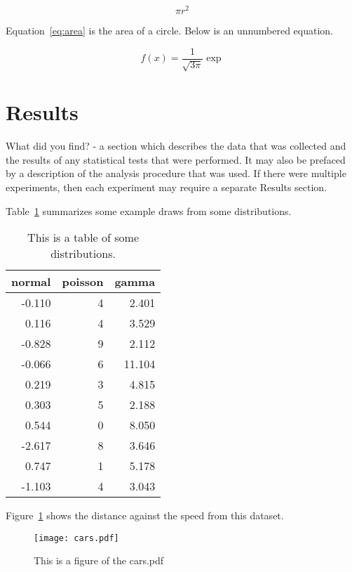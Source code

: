 \documentclass[12pt]{article}
\begin{document}
\begin{equation}
	\label{eq:area}
	\pi r^2
\end{equation}

Equation~\eqref{eq:area} is the area of a circle. Below is an unnumbered equation.

\[
f(x)=\frac{1}{\sqrt{3\pi}}\exp
\]

\section{Results}

What did you find? - a section which describes the data that was collected and the results of any statistical tests that were performed.  It may also be prefaced by a description of the analysis procedure that was used. If there were multiple experiments, then each experiment may require a separate Results section.

Table~\ref{tab:rv} summarizes some example draws from some distributions.



\begin{table}[ht]
  \caption{This is a table of some distributions.}
  \label{tab:rv}
\centering
\begin{tabular}{rrr}
  \toprule
normal & poisson & gamma \\ 
  \midrule
-0.110 & 4 & 2.401 \\ 
  0.116 & 4 & 3.529 \\ 
  -0.828 & 9 & 2.112 \\ 
  -0.066 & 6 & 11.104 \\ 
  0.219 & 3 & 4.815 \\ 
  0.303 & 5 & 2.188 \\ 
  0.544 & 0 & 8.050 \\ 
  -2.617 & 8 & 3.646 \\ 
  0.747 & 1 & 5.178 \\ 
  -1.103 & 4 & 3.043 \\ 
   \bottomrule
\end{tabular}
\end{table}

Figure~\ref{fig:cars} shows the distance against the speed from this dataset.

\begin{figure}
  \centering
  \texttt{[image: cars.pdf]}
  \caption{This is a figure of the cars.pdf}
  \label{fig:cars}
\end{figure}
\end{document}
